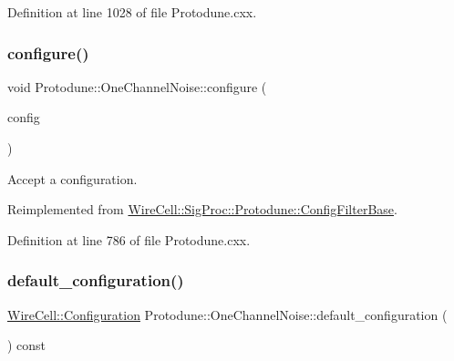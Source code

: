 Definition at line 1028 of file Protodune.\+cxx.

\mbox{\label{class_wire_cell_1_1_sig_proc_1_1_protodune_1_1_one_channel_noise_acf32ea2e00ad1f3e39e987aa30ca60c3}} 
\subsubsection{\texorpdfstring{configure()}{configure()}}
{\footnotesize\ttfamily void Protodune\+::\+One\+Channel\+Noise\+::configure (\begin{DoxyParamCaption}\item[{const \hyperlink{namespace_wire_cell_a9f705541fc1d46c608b3d32c182333ee}{Wire\+Cell\+::\+Configuration} \&}]{config }\end{DoxyParamCaption})\hspace{0.3cm}{\ttfamily [virtual]}}



Accept a configuration. 



Reimplemented from \hyperlink{class_wire_cell_1_1_sig_proc_1_1_protodune_1_1_config_filter_base_a70292e077d8a9a578494a64e9f9afa6a}{Wire\+Cell\+::\+Sig\+Proc\+::\+Protodune\+::\+Config\+Filter\+Base}.



Definition at line 786 of file Protodune.\+cxx.

\mbox{\label{class_wire_cell_1_1_sig_proc_1_1_protodune_1_1_one_channel_noise_a2f0a41f11d154f971da95d9127be594d}} 
\subsubsection{\texorpdfstring{default\+\_\+configuration()}{default\_configuration()}}
{\footnotesize\ttfamily \hyperlink{namespace_wire_cell_a9f705541fc1d46c608b3d32c182333ee}{Wire\+Cell\+::\+Configuration} Protodune\+::\+One\+Channel\+Noise\+::default\+\_\+configuration (\begin{DoxyParamCaption}{ }\end{DoxyParamCaption}) const\hspace{0.3cm}{\ttfamily [virtual]}}



